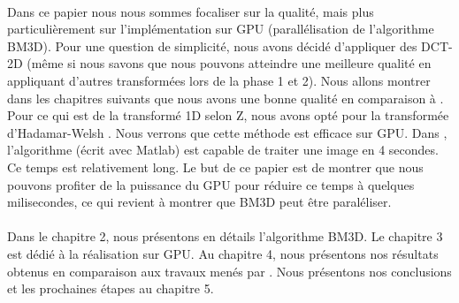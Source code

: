 \paragraph{}
Dans ce papier nous nous sommes focaliser sur la qualité, mais plus particulièrement sur l'implémentation sur GPU (parallélisation de l'algorithme BM3D). Pour une question de simplicité, nous avons décidé d'appliquer des DCT-2D (même si nous savons que nous pouvons atteindre une meilleure qualité en appliquant d'autres transformées lors de la phase 1 et 2). Nous allons montrer dans les chapitres suivants que nous avons une bonne qualité en comparaison à \cite{3}. Pour ce qui est de la transformé 1D selon Z, nous avons opté pour la transformée d'Hadamar-Welsh \cite{4}. Nous verrons que cette méthode est efficace sur GPU. Dans \cite{1}, l'algorithme (écrit avec Matlab) est capable de traiter une image en 4 secondes. Ce temps est relativement long. Le but de ce papier est  de montrer que nous pouvons profiter de la puissance du GPU pour  réduire ce temps à quelques milisecondes, ce qui revient à montrer que BM3D peut être paraléliser.   
\paragraph{}
Dans le chapitre 2, nous présentons en détails l'algorithme BM3D. Le chapitre 3 est dédié à la réalisation sur GPU. Au chapitre 4, nous présentons nos résultats obtenus en comparaison aux travaux menés par \cite{3}. Nous présentons nos conclusions et les prochaines étapes au chapitre  5.     